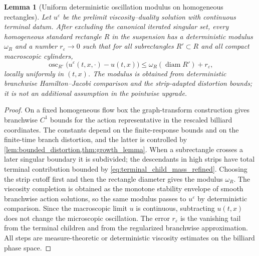 \documentclass[12pt, letterpaper]{amsart}
\DeclareMathOperator{\diam}{diam}
\DeclareMathOperator{\osc}{osc}
\theoremstyle{plain}
\newtheorem{lemma}[theorem]{Lemma}
\theoremstyle{definition}
\theoremstyle{remark}
\begin{document}
\begin{lemma}[Uniform deterministic oscillation modulus on homogeneous rectangles]
\label{lem:uniform_branchwise_oscillation}
Let $u^\varepsilon$ be the prelimit viscosity--duality solution with continuous
terminal datum.  After excluding the canonical iterated singular set, every
homogeneous standard rectangle $R$ in the suspension has a deterministic modulus
$\omega_R$ and a number $r_\varepsilon\to0$ such that for all subrectangles
$R'\subset R$ and all compact macroscopic cylinders,
\begin{equation}
\label{eq:derived_branchwise_oscillation_control}
    \osc_{R'}\bigl(u^\varepsilon(t,x,\cdot)-u(t,x)\bigr)
    \le \omega_R(\diam R')+r_\varepsilon,
\end{equation}
locally uniformly in $(t,x)$.  The modulus is obtained from deterministic
branchwise Hamilton--Jacobi comparison and the strip-adapted distortion bounds;
it is not an additional assumption in the pointwise upgrade.
\end{lemma}

\begin{proof}
On a fixed homogeneous flow box the graph-transform construction gives
branchwise $C^1$ bounds for the action representative in the rescaled billiard
coordinates.  The constants depend on the finite-response bounds and on the
finite-time branch distortion, and the latter is controlled by
\cref{lem:bounded_distortion,thm:growth_lemma}.  When a subrectangle crosses a
later singular boundary it is subdivided; the descendants in high strips have
total terminal contribution bounded by \eqref{eq:terminal_child_mass_refined}.
Choosing the strip cutoff first and then the rectangle diameter gives the
modulus $\omega_R$.  The viscosity completion is obtained as the monotone
stability envelope of smooth branchwise action solutions, so the same modulus
passes to $u^\varepsilon$ by deterministic comparison.  Since the macroscopic
limit $u$ is continuous, subtracting $u(t,x)$ does not change the microscopic
oscillation.  The error $r_\varepsilon$ is the vanishing tail from the terminal
children and from the regularized branchwise approximation.  All steps are
measure-theoretic or deterministic viscosity estimates on the billiard phase
space.
\end{proof}
\end{document}
